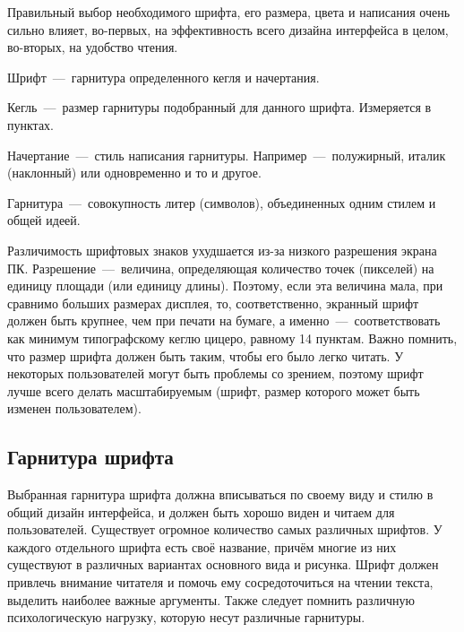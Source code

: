 \documentclass[14pt]{extarticle}
\begin{document}
Правильный выбор необходимого шрифта, его размера, цвета и написания очень сильно влияет, во-первых, на эффективность всего дизайна интерфейса в целом, во-вторых, на удобство чтения.

Шрифт~---~гарнитура определенного кегля и начертания.

Кегль~---~размер гарнитуры подобранный для данного шрифта. Измеряется в пунктах.

Начертание~---~стиль написания гарнитуры. Например~---~полужирный, италик (наклонный) или одновременно и то и другое.

Гарнитура~---~совокупность литер (символов), объединенных одним стилем и общей идеей.

Различимость шрифтовых знаков ухудшается из-за низкого разрешения экрана ПК. Разрешение~---~величина, определяющая количество точек (пикселей) на единицу площади (или единицу длины). Поэтому, если эта величина мала, при сравнимо больших размерах дисплея, то, соответственно, экранный шрифт должен быть крупнее, чем при печати на бумаге, а именно~---~соответствовать как минимум типографскому кеглю цицеро, равному 14 пунктам. Важно помнить, что размер шрифта должен быть таким, чтобы его было легко читать. У некоторых пользователей могут быть проблемы со зрением, поэтому шрифт лучше всего делать масштабируемым (шрифт, размер которого может быть изменен пользователем).

\subsection{Гарнитура шрифта}

Выбранная гарнитура шрифта должна вписываться по своему виду и стилю в общий дизайн интерфейса, и должен быть хорошо виден и читаем для пользователей. Существует огромное количество самых различных шрифтов. У каждого отдельного шрифта есть своё название, причём многие из них существуют в различных вариантах основного вида и рисунка. Шрифт должен привлечь внимание читателя и помочь ему сосредоточиться на чтении текста, выделить наиболее важные аргументы. Также следует помнить различную психологическую нагрузку, которую несут различные гарнитуры.
\end{document}
